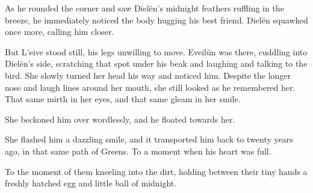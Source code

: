 As he rounded the corner and saw Dielën’s midnight feathers ruffling in the breeze, he immediately noticed the body hugging his best friend. Dielën squawked once more, calling him closer.

But L'eive stood still, his legs unwilling to move. Eveilün was there, cuddling into Dielën’s side, scratching that spot under his beak and laughing and talking to the bird. She slowly turned her head his way and noticed him. Despite the longer nose and laugh lines around her mouth, she still looked as he remembered her. That same mirth in her eyes, and that same gleam in her smile.

She beckoned him over wordlessly, and he floated towards her.

She flashed him a dazzling smile, and it transported him back to twenty years ago, in that same path of Greens. To a moment when his heart was full.

To the moment of them kneeling into the dirt, holding between their tiny hands a freshly hatched egg and little ball of midnight.
